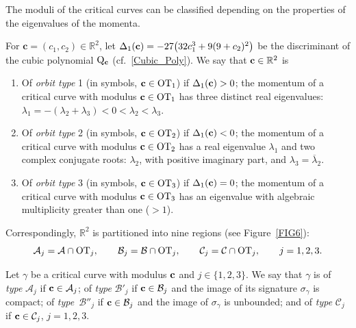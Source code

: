\documentclass[10pt,a4paper]{amsart}
\numberwithin{equation}{section}
\def\R{\mathbb{R}}
\begin{document}
The moduli of the critical curves can be classified depending on the properties of the eigenvalues of the momenta.

\begin{Definition}\label{orbittype}
For $\mathbf{c} = (c_1,c_2) \in \R^2$, let $\Delta_1({\bf c})=-27\big(32c_1^3+9(9+c_2)^2\big)$ be the
discriminant of the cubic polynomial ${\rm Q}_{{\bf c}}$ (cf.~\eqref{Cubic_Poly}).
%
We say that
 ${\bf c}\in \R^2$ is
\begin{enumerate}\itemsep=0pt
\item Of \textit{orbit type} 1 (in symbols, ${\bf c}\in {\rm OT}_1$) if $\Delta_1({\bf c})>0$;
the momentum of a critical curve with modulus ${\bf c}\in {\rm OT}_1$ has three distinct real eigenvalues:
$\lambda_1=-(\lambda_2+\lambda_3)<0<\lambda_2<\lambda_3$.
%
\item
Of \textit{orbit type} 2 (in symbols, ${\bf c}\in {\rm OT}_2$) if $\Delta_1({\bf c})<0$;
the momentum of a critical curve
with modulus ${\bf c}\in {\rm OT}_2$ has a real eigenvalue $\lambda_1$ and two complex conjugate roots: $\lambda_2$,
with positive imaginary part, and $\lambda_{3}=\overline{\lambda}_2$.
%
\item Of \textit{orbit type} 3 (in symbols, ${\bf c}\in {\rm OT}_3$) if $\Delta_1({\bf c})=0$;
the momentum of a critical curve with modulus ${\bf c}\in {\rm OT}_3$ has an eigenvalue with algebraic multiplicity
greater than one ($>1$).
\end{enumerate}
\end{Definition}

Correspondingly, $\R^2$ is partitioned into nine regions (see Figure~\ref{FIG6}):
\[
{\mathcal A}_j={\mathcal A}\cap {\rm OT}_j,\qquad {\mathcal B}_j={\mathcal B}\cap {\rm OT}_j,\qquad
 {\mathcal C}_j={\mathcal C}\cap {\rm OT}_j,\qquad j=1,2,3.
\]

\begin{Definition}
Let $\gamma$ be a critical curve with modulus ${\bf c}$ and $j\in \{1,2,3\}$.
We say that $\gamma$ is of \textit{type} ${\mathcal A}_j$ if ${\bf c}\in {\mathcal A}_j$;
of \textit{type} ${\mathcal B}'_j$ if ${\bf c}\in {\mathcal B}_j$
and the image of its signature $\sigma_{\gamma}$ is compact;
of \textit{type}~${\mathcal B}''_j$ if ${\bf c}\in {\mathcal B}_j$ and the image of $\sigma_{\gamma}$ is unbounded;
and
of \textit{type} ${\mathcal C}_j$ if ${\bf c}\in {\mathcal C}_j$, $j=1,2,3$.
\end{Definition}
\end{document}
